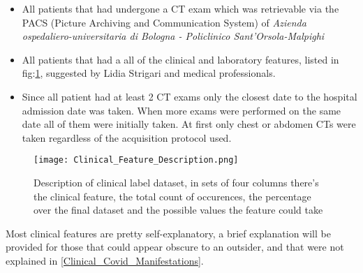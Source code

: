 \begin{itemize}
\item All patients that had undergone a CT exam which was retrievable via the PACS (Picture Archiving and Communication System) of \textit{Azienda ospedaliero-universitaria di Bologna - Policlinico Sant'Orsola-Malpighi}
\item All patients that had a all of the clinical and laboratory features, listed in fig:\ref{fig:ClinicalFeatures}, suggested by Lidia Strigari and medical professionals.
\item Since all patient had at least 2 CT exams only the closest date to the hospital admission date was taken. When more exams were performed on the same date all of them were initially taken. At first only chest or abdomen CTs were taken regardless of the acquisition protocol used.
\end{itemize}

\begin{figure}[H]
  		\texttt{[image: Clinical\_Feature\_Description.png]}
        \caption{Description of clinical label dataset, in sets of four columns there's the clinical feature, the total count of occurences, the percentage over the final dataset and the possible values the feature could take \label{fig:ClinicalFeatures}}
\end{figure}

Most clinical features are pretty self-explanatory, a brief explanation will be provided for those that could appear obscure to an outsider, and that were not explained in \ref{Clinical_Covid_Manifestations}.

